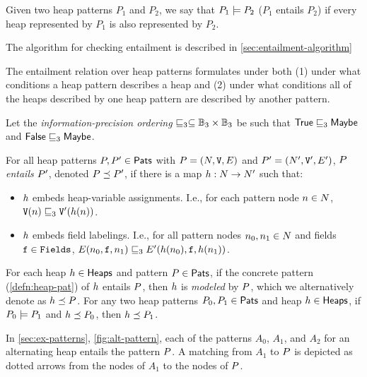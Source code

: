 \begin{defn}
  \label{ex:pat-entails-defn}
  Given two heap patterns $P_1$ and $P_2$, we say that $P_1 \models P_2$ ($P_1$ entails $P_2$) if every heap represented by $P_1$ is also represented by $P_2$.
\end{defn}

The algorithm for checking entailment is described in \autoref{sec:entailment-algorithm}

The entailment relation over heap patterns formulates under both (1)
under what conditions a heap pattern describes a heap and (2) under
what conditions all of the heaps described by one heap pattern are
described by another pattern.
%
\begin{defn}
  \label{defn:match}
  Let the \emph{information-precision ordering} $\sqsubseteq_3 \subseteq
  \mathbb{B}_3 \times \mathbb{B}_3$ be such that $\mathsf{True} \sqsubseteq_3 \mathsf{Maybe}$
  and $\mathsf{False} \sqsubseteq_3 \mathsf{Maybe}$.

  For all heap patterns $P, P' \in \mathsf{Pats}$ with $P =
  (N, \mathtt{V}, E)$ and $P' = (N',
  \mathtt{V}', E')$, $P$ \emph{entails} $P'$, denoted
  $P \preceq P'$, if there is a map $h: N
  \to N'$ such that:
  \begin{itemize}
  \item
    $h$ embeds heap-variable assignments.
    I.e., for each pattern node $n \in N$,
    $\mathtt{V}(n) \sqsubseteq_3 \mathtt{V}'(h(n))$.
  \item
    $h$ embeds field labelings.
    I.e., for all pattern nodes $n_0, n_1 \in N$
    and fields $\mathtt{f} \in \mathtt{Fields}$, $E(n_0, \mathtt{f},
    n_1) \sqsubseteq_3 E'(h(n_0), \mathtt{f},
    h(n_1))$.
  \end{itemize}
\end{defn}
For each heap $h \in \mathsf{Heaps}$ and pattern $P \in \mathsf{Pats}$,
if the concrete pattern (\autoref{defn:heap-pat}) of $h$ entails
$P$, then $h$ is \emph{modeled} by $P$, which we
alternatively denote as $h \preceq P$.
%
For any two heap patterns $P_0, P_1 \in \mathsf{Pats}$ and heap
$h \in \mathsf{Heaps}$, if $P_0 \models P_1$ and $h
\preceq P_0$, then $h \preceq P_1$.
%
\begin{defn}
  \label{ex:pat-entails}
  In \autoref{sec:ex-patterns}, \autoref{fig:alt-pattern}, each of the
  patterns $A_0$, $A_1$, and $A_2$ for an alternating heap entails the
  pattern $P$.
  A matching from $A_1$ to $P$ is depicted as dotted arrows from
  the nodes of $A_1$ to the nodes of $P$.
\end{defn}

